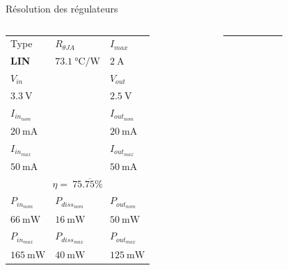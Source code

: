 \begin{frame}{Résolution des régulateurs}
    \small
    \begin{columns}
        \begin{column}{0.33\textwidth}
            \vspace{-6pt}
            \begin{tabular}{C{0.25\textwidth} | C{0.25\textwidth} | C{0.25\textwidth}}
                \\
                \hline

                Type         & $R_{\theta JA}$                & $I_{max}$\\
                \textbf{LIN} & $\SI{73.1}{\celsius\per\watt}$ & $\SI{2}{\ampere}$\\
                \hline

                $V_{in}$          & & $V_{out}$\\
                $\SI{3.3}{\volt}$ & & $\SI{2.5}{\volt}$\\
                \hline

                $I_{in_{nom}}$           & & $I_{out_{nom}}$\\
                $\SI{20}{\milli\ampere}$ & & $\SI{20}{\milli\ampere}$\\
                $I_{in_{max}}$           & & $I_{out_{max}}$\\
                $\SI{50}{\milli\ampere}$ & & $\SI{50}{\milli\ampere}$\\
                \hline

                \\
                \hline

                $P_{in_{nom}}$         & $P_{diss_{nom}}$       & $P_{out_{nom}}$\\
                $\SI{66}{\milli\watt}$ & $\SI{16}{\milli\watt}$ & $\SI{50}{\milli\watt}$\\

                $P_{in_{max}}$          & $P_{diss_{max}}$       & $P_{out_{max}}$\\
                $\SI{165}{\milli\watt}$ & $\SI{40}{\milli\watt}$ & $\SI{125}{\milli\watt}$
            \end{tabular}
        \end{column}
        \begin{column}{0.001\textwidth}
            \rule{0.1mm}{0.85\textheight}
        \end{column}
        \begin{column}{0.33\textwidth}
            \vspace{-6pt}
            \begin{tabular}{C{0.25\textwidth} | C{0.25\textwidth} | C{0.25\textwidth}}
                \\
                \hline


\end{tabular}
\end{column}
\end{columns}
\end{frame}
